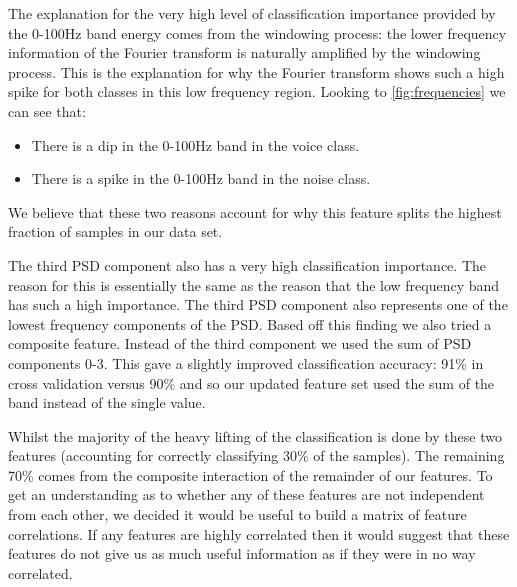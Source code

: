 \documentclass[ %
                    author={Sam Phippen},
                supervisor={Dr. Rafal Bogacz},
                     title={Real time voice activity detectors in noisy personal computing environments},
                  subtitle={},
                    degree={MEng},
                      year={2012} ]{thesis}
\begin{document}
The explanation for the very high level of classification importance provided
by the 0-100Hz band energy comes from the windowing process: the lower
frequency information of the Fourier transform is naturally amplified by the
windowing process. This is the explanation for why the Fourier transform shows
such a high spike for both classes in this low frequency region. Looking to
\ref{fig:frequencies} we can see that:

\begin{itemize}

    \item There is a dip in the 0-100Hz band in the voice class.

    \item There is a spike in the 0-100Hz band in the noise class.

\end{itemize}

We believe that these two reasons account for why this feature splits the
highest fraction of samples in our data set.

The third PSD component also has a very high classification importance. The
reason for this is essentially the same as the reason that the low frequency
band has such a high importance. The third PSD component also represents one of
the lowest frequency components of the PSD. Based off this finding we also
tried a composite feature. Instead of the third component we used the sum of
PSD components 0-3. This gave a slightly improved classification accuracy: 91\%
in cross validation versus 90\% and so our updated feature set used the sum of
the band instead of the single value.

Whilst the majority of the heavy lifting of the classification is done by these
two features (accounting for correctly classifying 30\% of the samples). The
remaining 70\% comes from the composite interaction of the remainder of our
features. To get an understanding as to whether any of these features are not
independent from each other, we decided it would be useful to build a matrix of
feature correlations. If any features are highly correlated then it would
suggest that these features do not give us as much useful information as if
they were in no way correlated.
\end{document}
